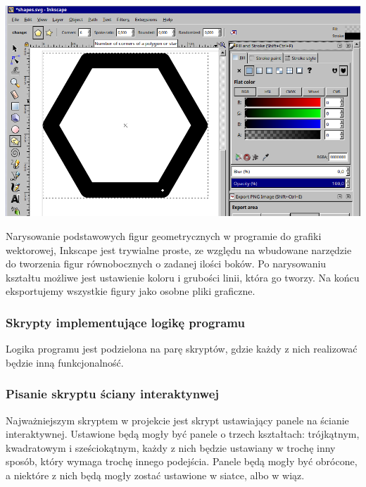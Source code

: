 \documentclass{article} %
\begin{document}
            \begin{center}
            \includegraphics[scale=0.3,keepaspectratio=true]{images/screenshots/work/6-tworzenie-ui_002.png}
            \end{center}

            
            Narysowanie podstawowych figur geometrycznych w programie do grafiki wektorowej, Inkscape jest trywialne proste, ze względu na wbudowane narzędzie do tworzenia figur równobocznych o zadanej ilości boków. Po narysowaniu kształtu możliwe jest ustawienie koloru i grubości linii, która go tworzy. Na końcu eksportujemy wszystkie figury jako osobne pliki graficzne.
            \\
        
        \subsubsection{Skrypty implementujące logikę programu}
            Logika programu jest podzielona na parę skryptów, gdzie każdy z nich realizować będzie inną funkcjonalność. 
            
            
        \subsubsection*{Pisanie skryptu ściany interaktynwej}
            Najważniejszym skryptem w projekcie jest skrypt ustawiający panele na ścianie interaktywnej. Ustawione będą mogły być panele o trzech kształtach: trójkątnym, kwadratowym i sześciokątnym, każdy z nich będzie ustawiany w trochę inny sposób, który wymaga trochę innego podejścia. Panele będą mogły być obrócone, a niektóre z nich będą mogły zostać ustawione w siatce, albo w wiąz. 
            \\
            
\end{document}
